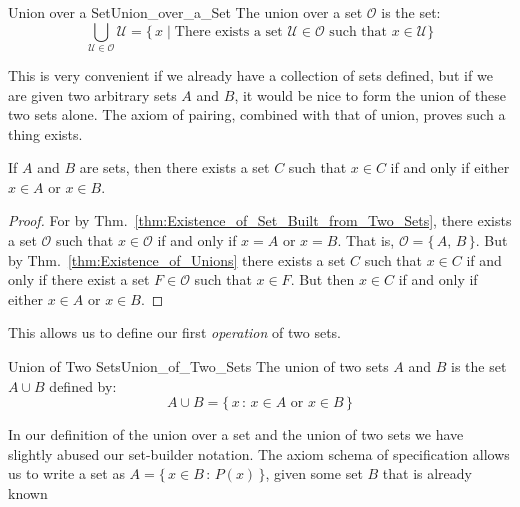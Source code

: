         \begin{fdefinition}{Union over a Set}{Union_over_a_Set}
            The \gls{union over a set} $\mathcal{O}$ is the set:
            \begin{equation}
                \bigcup_{\mathcal{U}\in\mathcal{O}}\mathcal{U}
                =\big\{\,x\;|\;\textrm{There exists a set }
                         \mathcal{U}\in\mathcal{O}\textrm{ such that }
                         x\in\mathcal{U}\big\}
            \end{equation}
        \end{fdefinition}
        This is very convenient if we already have a collection of sets
        defined, but if we are given two arbitrary sets $A$ and $B$, it would
        be nice to form the union of these two sets alone. The axiom of
        pairing, combined with that of union, proves such a thing exists.
        \begin{theorem}
            If $A$ and $B$ are sets, then there exists a set $C$ such that
            $x\in{C}$ if and only if either $x\in{A}$ or $x\in{B}$.
        \end{theorem}
        \begin{proof}
            For by Thm.~\ref{thm:Existence_of_Set_Built_from_Two_Sets},
            there exists a set $\mathcal{O}$ such that $x\in\mathcal{O}$ if and
            only if $x=A$ or $x=B$. That is, $\mathcal{O}=\{\,A,\,B\,\}$.
            But by Thm.~\ref{thm:Existence_of_Unions} there exists a set
            $C$ such that $x\in{C}$ if and only if there exist a set
            $F\in\mathcal{O}$ such that $x\in{F}$. But then $x\in{C}$ if and
            only if either $x\in{A}$ or $x\in{B}$.
        \end{proof}
        This allows us to define our first \textit{operation} of two sets.
        \begin{fdefinition}{Union of Two Sets}{Union_of_Two_Sets}
            The union of two sets $A$ and $B$ is the set $A\cup{B}$ defined by:
            \begin{equation}
                A\cup{B}=\{\,x\,:\,x\in{A}\textrm{ or }x\in{B}\,\}
            \end{equation}
        \end{fdefinition}
        In our definition of the union over a set and the union of two sets
        we have slightly abused our set-builder notation. The axiom schema
        of specification allows us to write a set as
        $A=\{\,x\in{B}\,:\,P(x)\,\}$, given some set $B$ that is already known
